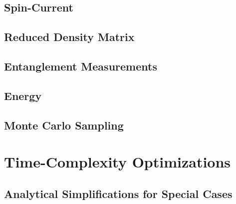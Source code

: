 \documentclass[
headings=optiontohead,              %
12pt,                               %
DIV=13,                             %
twoside=false,                      %
open=right,                         %
BCOR=00mm,                          %
toc=bibliographynumbered            %
]{scrreport}
\begin{document}
        \subsection{Spin-Current}
        \label{sec:theory-observables-current}
        
        \FloatBarrier

        \subsection{Reduced Density Matrix}
        \label{sec:theory-observables-density-matrix}
        
        \FloatBarrier
        
        \subsection{Entanglement Measurements}
        \label{sec:theory-observables-entanglement}
        
        \FloatBarrier
        
        \subsection{Energy}
        \label{sec:theory-observables-energy}
        
        \FloatBarrier

        \subsection{Monte Carlo Sampling}
        \label{sec:theory-monte-carlo}
        
        \FloatBarrier
        
    \section{Time-Complexity Optimizations}
    \label{sec:theory-optimizations}
    
    \FloatBarrier

        \subsection{Analytical Simplifications for Special Cases}
        \label{sec:theory-optimizations-analytical}
        
        \FloatBarrier
\end{document}
